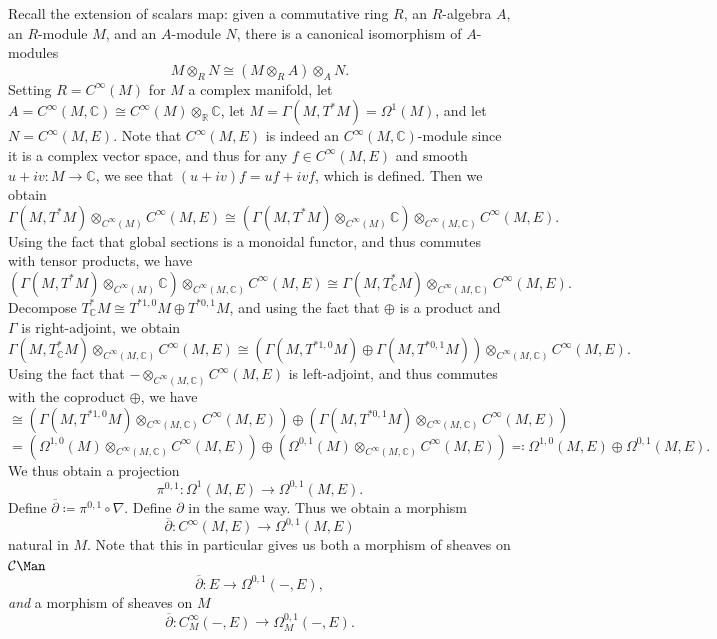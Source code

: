 \begin{discussion}
	Recall the extension of scalars map: given a commutative ring $R$, an $R$-algebra $A$, an $R$-module $M$, and an $A$-module $N$, there is a canonical isomorphism of $A$-modules
	\[
		M\otimes _RN \cong (M\otimes _RA)\otimes _AN
	.\]
	Setting $R=C^\infty (M)$ for $M$ a complex manifold, let $A=C^\infty (M,\mathbb{C} )\cong C^\infty (M)\otimes _{\mathbb{R} } \mathbb{C} $, let $M=\Gamma (M,T^*M) = \Omega ^1(M)$, and let $N=C^\infty (M,E)$. Note that $C^\infty(M,E) $ is indeed an $C^\infty(M,\mathbb{C} ) $-module since it is a complex vector space, and thus for any $f\in C^\infty (M,E)$ and smooth $u+iv : M \to \mathbb{C} $, we see that $(u+iv)f = uf + ivf$, which is defined. Then we obtain
	\[
		\Gamma (M,T^*M) \otimes_{C^\infty (M)} C^\infty (M,E) \cong \left(\Gamma (M,T^*M)\otimes _{C^\infty (M)} \mathbb{C} \right) \otimes_{C^\infty(M,\mathbb{C} ) } C^\infty(M,E) 
	.\]
	Using the fact that global sections is a monoidal functor, and thus commutes with tensor products, we have
	\[
		\left(\Gamma (M,T^*M)\otimes _{C^\infty (M)} \mathbb{C}\right) \otimes _{C^\infty (M,\mathbb{C} )} C^\infty(M,E) \cong \Gamma (M,T^*_{\mathbb{C} } M)\otimes _{C^\infty(M,\mathbb{C} ) } C^\infty(M,E) 
	.\]
	Decompose $T^*_{\mathbb{C} } M \cong T^{*1,0} M\oplus T^{*0,1} M$, and using the fact that $\oplus $ is a product and $\Gamma $ is right-adjoint, we obtain
	\[
		\Gamma (M,T^*_{\mathbb{C} } M)\otimes _{C^\infty(M,\mathbb{C} ) } C^\infty(M,E) \cong (\Gamma (M,T^{*1,0} M)\oplus \Gamma (M,T^{*0,1} M))\otimes _{C^\infty(M,\mathbb{C} ) } C^\infty(M,E) 
	.\]
	Using the fact that $-\otimes_{C^\infty(M,\mathbb{C} ) }C^\infty(M,E) $ is left-adjoint, and thus commutes with the coproduct $\oplus $, we have
	\[
			\cong \left(\Gamma(M,T^{*1,0} M)\otimes _{C^\infty(M,\mathbb{C} ) } C^\infty(M,E)\right)\oplus \left( \Gamma (M,T^{*0,1} M)\otimes _{C^\infty(M,\mathbb{C} ) } C^\infty(M,E)  \right) 
	\]
	\[
		=\left( \Omega ^{1,0} (M) \otimes _{C^\infty(M,\mathbb{C} ) } C^\infty(M,E)  \right) \oplus \left( \Omega ^{0,1} (M)\otimes _{C^\infty(M,\mathbb{C} ) } C^\infty(M,E)  \right) \eqqcolon \Omega ^{1,0} (M,E)\oplus \Omega ^{0,1} (M,E)
	.\]
	We thus obtain a projection
	\[
		\pi ^{0,1} : \Omega ^1(M,E) \to \Omega ^{0,1} (M,E)
	.\]
	Define $\overline{\partial } \coloneqq \pi ^{0,1} \circ \nabla $. Define $\partial $ in the same way. Thus we obtain a morphism
	\[
		\overline{\partial } : C^\infty(M,E)  \to \Omega ^{0,1} (M,E)
	\]
	natural in $M$. Note that this in particular gives us both a morphism of sheaves on $\mathcal{C} \Man $
	\[
		\overline{\partial } : E \to \Omega ^{0,1} (-,E),
	\]
	\emph{and} a morphism of sheaves on $M$
	\[
		\overline{\partial } : C^\infty_{M}(-,E)  \to \Omega ^{0,1}_M(-,E)
	.\]


\end{discussion}
